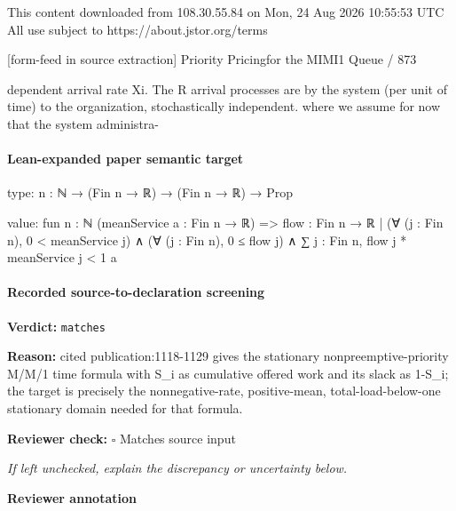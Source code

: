 \documentclass[10pt]{article}
\newcommand{\reviewerbox}{%
  \par\noindent\fbox{\parbox{0.96\linewidth}{\rule{0pt}{0.38in}}}\par
}
\newcommand{\reviewmatch}[1]{%
  \par\noindent\textbf{Reviewer check:} $\square$\; #1\par
  \noindent\emph{If left unchecked, explain the discrepancy or uncertainty below.}\par
}
\begin{document}
\begin{ReviewVerbatim}
                                                 This content downloaded from
                               108.30.55.84 on Mon, 24 Aug 2026 10:55:53 UTC
                                         All use subject to https://about.jstor.org/terms

[form-feed in source extraction]
                                                                                Priority Pricingfor the MIMI1 Queue / 873

dependent arrival rate Xi. The R arrival processes are                 by the system (per unit of time) to the organization,
stochastically independent.                                            where we assume for now that the system administra-
\end{ReviewVerbatim}



\paragraph{Lean-expanded paper semantic target}
\begin{ReviewVerbatim}
type:
{n : ℕ} → (Fin n → ℝ) → (Fin n → ℝ) → Prop

value:
fun {n : ℕ} (meanService a : Fin n → ℝ) =>
  {flow : Fin n → ℝ |
      (∀ (j : Fin n), 0 < meanService j) ∧ (∀ (j : Fin n), 0 ≤ flow j) ∧ ∑ j : Fin n, flow j * meanService j < 1}
    a
\end{ReviewVerbatim}


\paragraph{Recorded source-to-declaration screening}
\textbf{Verdict:} \texttt{matches}
\\
{\raggedright
\textbf{Reason:} cited publication:\allowbreak{}1118-\allowbreak{}1129 gives the stationary nonpreemptive-\allowbreak{}priority M/\allowbreak{}M/\allowbreak{}1 time formula with S\_\allowbreak{}i as cumulative offered work and its slack as 1-\allowbreak{}S\_\allowbreak{}i;\allowbreak{} the target is precisely the nonnegative-\allowbreak{}rate, positive-\allowbreak{}mean, total-\allowbreak{}load-\allowbreak{}below-\allowbreak{}one stationary domain needed for that formula.\allowbreak{}
\par}
\reviewmatch{Matches source input}
\noindent\textbf{Reviewer annotation}\par
\reviewerbox
\clearpage
\hypertarget{paper-prerequisite-3ae6b5293fffafb7}{}
\end{document}
